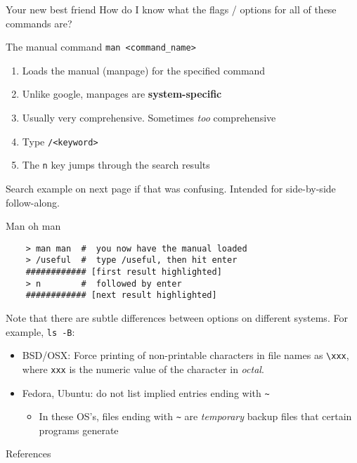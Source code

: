 \documentclass[11pt]{beamer}
\newcommand{\colbf}[1]{\textcolor{mLightBrown!77!black}{#1}}%
\begin{document}
\begin{frame}[fragile]{Your new best friend}
  How do I know what the flags / options for all of these commands are?

  \begin{block}{The \colbf{man}ual command}
    \texttt{man <command\_name>}
    \begin{enumerate}[\--]
      \item Loads the manual (manpage) for the specified command
      \item Unlike google, manpages are \textbf{system-specific}
      \item Usually very comprehensive.  Sometimes \emph{too} comprehensive
      \item Type \texttt{/<keyword>}
      \item The \texttt{n} key jumps through the search results
    \end{enumerate}
  \end{block}
  Search example on next page if that was confusing.  Intended for side-by-side follow-along.
\end{frame}

\begin{frame}[fragile]{Man oh man}
  \begin{verbatim}
    > man man  #  you now have the manual loaded
    > /useful  #  type /useful, then hit enter
    ############ [first result highlighted]
    > n        #  followed by enter
    ############ [next result highlighted]
  \end{verbatim}
  Note that there are subtle differences between options on different systems.  For example, \texttt{ls -B}:
  \begin{itemize}
    \item BSD/OSX: Force printing of non-printable characters in file names as \texttt{\textbackslash xxx},
          where \texttt{xxx} is the numeric value of the character in \emph{octal}.
    \item Fedora, Ubuntu: do not list implied entries ending with \texttt{\textasciitilde}
    \begin{itemize}
      \item In these OS's, files ending with \texttt{\textasciitilde} are \emph{temporary} backup files that
            certain programs generate
    \end{itemize}
  \end{itemize}
\end{frame}

%

\begin{frame}[allowframebreaks]{References}
  
  
\end{frame}
\end{document}
